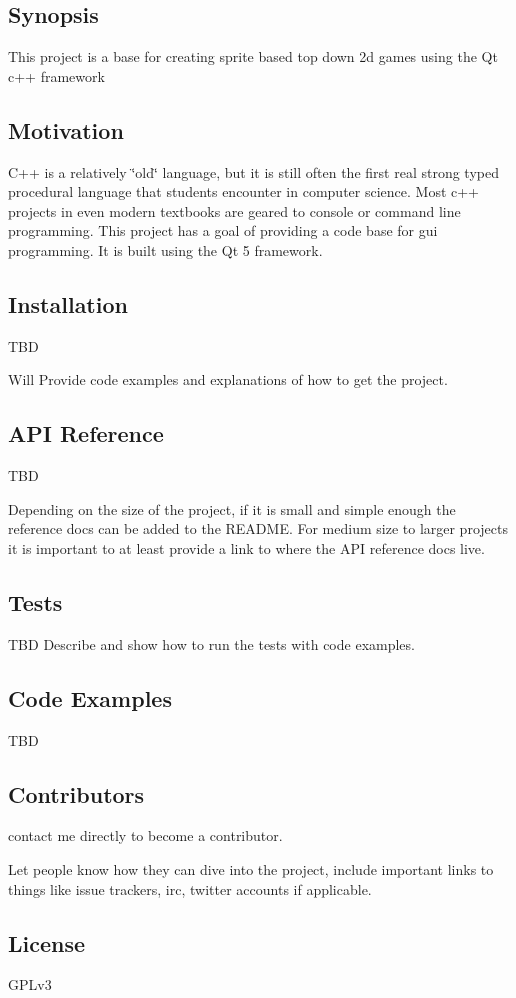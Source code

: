 \subsection*{Synopsis}

This project is a base for creating sprite based top down 2d games using the Qt c++ framework

\subsection*{Motivation}

C++ is a relatively \char`\"{}old\char`\"{} language, but it is still often the first real strong typed procedural language that students encounter in computer science. Most c++ projects in even modern textbooks are geared to console or command line programming. This project has a goal of providing a code base for gui programming. It is built using the Qt 5 framework.

\subsection*{Installation}

T\+BD

Will Provide code examples and explanations of how to get the project.

\subsection*{A\+PI Reference}

T\+BD

Depending on the size of the project, if it is small and simple enough the reference docs can be added to the R\+E\+A\+D\+ME. For medium size to larger projects it is important to at least provide a link to where the A\+PI reference docs live.

\subsection*{Tests}

T\+BD Describe and show how to run the tests with code examples.

\subsection*{Code Examples}

T\+BD

\subsection*{Contributors}

contact me directly to become a contributor.

Let people know how they can dive into the project, include important links to things like issue trackers, irc, twitter accounts if applicable.

\subsection*{License}

G\+P\+Lv3 